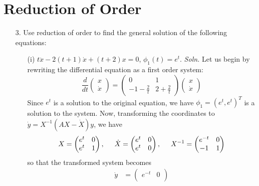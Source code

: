 \documentclass{article}
\begin{document}
\section*{Reduction of Order}
\begin{itemize}
    \item[3.] Use reduction of order to find the general solution of the following equations:
    \begin{itemize}
        \item[(i)] $t\ddot{x} - 2(t + 1)\dot{x} + (t + 2)x = 0$, $\phi_1(t) = e^t$.
        \newline\newline
        \textit{Soln.} Let us begin by rewriting the differential equation as a first order system:
        \[\frac{d}{dt}\begin{pmatrix}
            x\\
            \dot{x}
        \end{pmatrix} = \begin{pmatrix}
            0 & 1\\
            -1-\tfrac{2}{t} & 2 + \tfrac{2}{t}
        \end{pmatrix}\begin{pmatrix}
            x\\
            \dot{x}
        \end{pmatrix}\]
        Since $e^t$ is a solution to the original equation, we have $\phi_1 = (e^t,e^t)^T$ is a solution to the system. Now, transforming the coordinates to $\dot{y} = X^{-1}(AX - \dot{X})y$, we have
        \[X = \begin{pmatrix}
            e^t & 0\\
            e^t & 1
        \end{pmatrix}, \hspace{0.5cm} \dot{X} = \begin{pmatrix}
            e^t & 0\\
            e^t & 0
        \end{pmatrix},\hspace{0.5cm} X^{-1} = \begin{pmatrix}
            e^{-t} & 0\\
            -1 & 1
        \end{pmatrix}\]
        so that the transformed system becomes
        \begin{align*}
            \dot{y} &= \begin{pmatrix}
                e^{-t} & 0\\

\end{pmatrix}
\end{align*}
\end{itemize}
\end{itemize}
\end{document}
